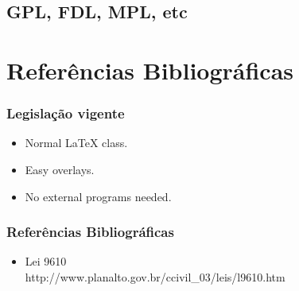 \documentclass{beamer}
\begin{document}
\subsection{GPL, FDL, MPL, etc}

\section{Referências Bibliográficas}

\frame
{
  \frametitle{Legislação vigente}
  \begin{itemize}
	\item Normal LaTeX class.
	\item Easy overlays.
 	\item No external programs needed.      
  \end{itemize}
}

\frame
{
	\frametitle{Referências Bibliográficas}
	\begin{itemize}
		\item Lei 9610 \\
		http://www.planalto.gov.br/ccivil\_03/leis/l9610.htm
	\end{itemize}

}
\end{document}
